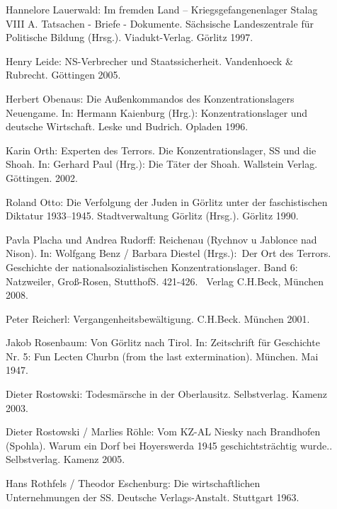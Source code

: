\begin{description}
\item[]{Hannelore Lauerwald: \glqq Im fremden Land -- Kriegsgefangenenlager Stalag VIII A. Tatsachen - Briefe - Dokumente\grqq. Sächsische Landeszentrale für Politische Bildung (Hrsg.). Viadukt-Verlag. Görlitz 1997.}

\item[]{Henry Leide: \glqq NS-Verbrecher und Staatssicherheit\grqq. Vandenhoeck \& Rubrecht. Göttingen 2005. }

\item[]{Herbert Obenaus: \glqq Die Außenkommandos des Konzentrationslagers Neuengame\grqq. In: Hermann Kaienburg (Hrg.): \glqq Konzentrationslager und deutsche Wirtschaft\grqq. Leske und Budrich. Opladen 1996.}

\item[]{Karin Orth: \glqq Experten des Terrors. Die Konzentrationslager, SS und die Shoah\grqq. In: Gerhard Paul (Hrg.): \glqq Die Täter der Shoah\grqq. Wallstein Verlag. Göttingen. 2002.}

\item[]{Roland Otto: \glqq Die Verfolgung der Juden in Görlitz unter der faschistischen Diktatur 1933--1945\grqq. Stadtverwaltung Görlitz (Hrsg.). Görlitz 1990.}

\item[]{Pavla Placha und Andrea Rudorff: \glqq Reichenau (Rychnov u Jablonce nad Nison)\grqq. In: Wolf­gang Benz / Bar­bara Die­s­tel (Hrgs.): \glqq Der Ort des Terrors. Geschichte der nationalsozialistischen Konzentrationslager. Band 6: Natzweiler, Groß-Rosen, Stutthof\grqq S. 421-426.  Ver­lag C.H.Beck, Mün­chen 2008.}

\item[]{Peter Reicherl: \glqq Vergangenheitsbewältigung\grqq. C.H.Beck. München 2001.}

\item[]{Jakob Rosenbaum: \glqq Von Görlitz nach Tirol\grqq. In: \glqq Zeitschrift für Geschichte Nr. 5\grqq: Fun Lecten Churbn (from the last extermination). München. Mai 1947.}	

\item[]{Dieter Rostowski: \glqq Todesmärsche in der Oberlausitz\grqq. Selbstverlag. Kamenz 2003. }

\item[]{Dieter Rostowski / Marlies Röhle: \glqq Vom KZ-AL Niesky nach Brandhofen (Spohla). Warum ein Dorf bei Hoyerswerda 1945 geschichtsträchtig wurde.\grqq. Selbstverlag. Kamenz 2005.}

\item[]{Hans Rothfels / Theodor Eschenburg: \glqq Die wirtschaftlichen Unternehmungen der SS\grqq. Deutsche Verlags-Anstalt. Stuttgart 1963. }


\end{description}
